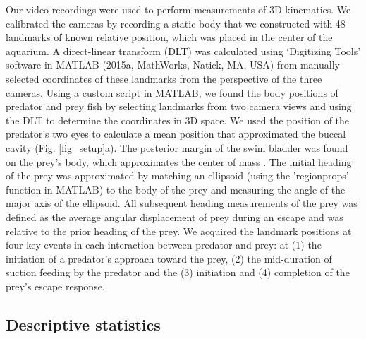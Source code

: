 \documentclass[]{rsos}%
\begin{document}
Our video recordings were used to perform measurements of 3D kinematics. 
We calibrated the cameras by recording a static body that we constructed with 48 landmarks of known relative position, which was placed in the center of the aquarium.
A direct-linear transform (DLT) was calculated using `Digitizing Tools' software in MATLAB (2015a, MathWorks, Natick, MA, USA) \cite{Hedrick:2008wz} from manually-selected coordinates of these landmarks from the perspective of the three cameras.
Using a custom script in MATLAB, we found the body positions of predator and prey fish by selecting landmarks from two camera views and using the DLT to determine the coordinates in 3D space.
We used the position of the predator's two eyes to calculate a mean position that approximated the buccal cavity (Fig. \ref{fig_setup}a).
The posterior margin of the swim bladder was found on the prey's body, which approximates the center of mass \cite{Stewart:2010ig}.
The initial heading of the prey was approximated by matching an ellipsoid (using the 'regionprops' function in MATLAB) to the body of the prey and measuring the angle of the major axis of the ellipsoid.
All subsequent heading measurements of the prey was defined as the average angular displacement of prey during an escape and was relative to the prior heading of the prey.
We acquired the landmark positions at four key events in each interaction between predator and prey: at (1) the initiation of a predator's approach toward the prey, (2) the mid-duration of suction feeding by the predator and the (3) initiation and (4) completion of the prey's escape response.


\subsection{Descriptive statistics}
\end{document}
